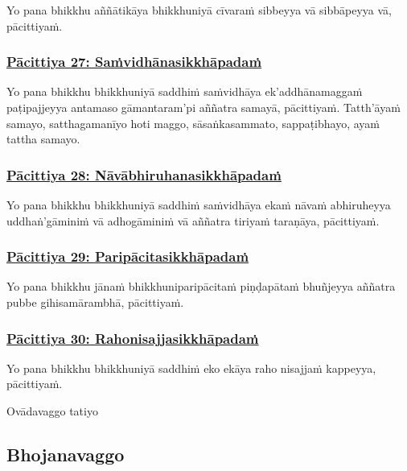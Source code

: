 Yo pana bhikkhu aññātikāya bhikkhuniyā cīvaraṁ sibbeyya vā sibbāpeyya vā, pācittiyaṁ.

\subsubsection*{\hyperref[exp27]{Pācittiya 27: Saṁvidhānasikkhāpadaṁ}}
\label{pac27}

Yo pana bhikkhu bhikkhuniyā saddhiṁ saṁvidhāya ek'addhānamaggaṁ paṭipajjeyya antamaso gāmantaram'pi aññatra samayā, pācittiyaṁ. Tatth'āyaṁ samayo, satthagamanīyo hoti maggo, sāsaṅkasammato, sappaṭibhayo, ayaṁ tattha samayo.

\subsubsection*{\hyperref[exp28]{Pācittiya 28: Nāvābhiruhanasikkhāpadaṁ}}
\label{pac28}

Yo pana bhikkhu bhikkhuniyā saddhiṁ saṁvidhāya ekaṁ nāvaṁ abhiruheyya uddhaṅ'gāminiṁ vā adhogāminiṁ vā aññatra tiriyaṁ taraṇāya, pācittiyaṁ.

\subsubsection*{\hyperref[exp29]{Pācittiya 29: Paripācitasikkhāpadaṁ}}
\label{pac29}

Yo pana bhikkhu jānaṁ bhikkhuniparipācitaṁ piṇḍapātaṁ bhuñjeyya aññatra pubbe gihisamārambhā, pācittiyaṁ.

\subsubsection*{\hyperref[exp30]{Pācittiya 30: Rahonisajjasikkhāpadaṁ}}
\label{pac30}

Yo pana bhikkhu bhikkhuniyā saddhiṁ eko ekāya raho nisajjaṁ kappeyya, pācittiyaṁ.

\begin{center}
  Ovādavaggo tatiyo
\end{center}

\subsection{Bhojanavaggo}
\vspace{0.2cm}

